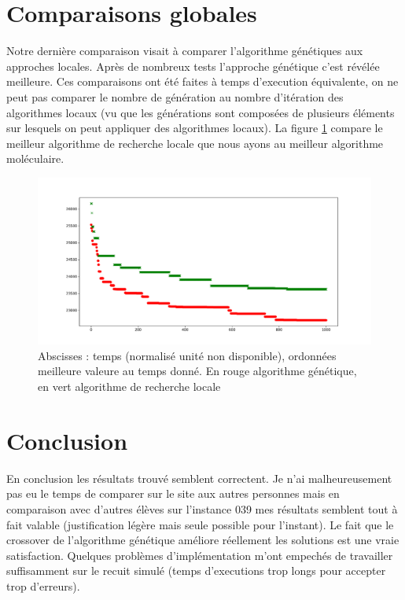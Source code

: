 \documentclass[10pt,a4paper]{article}
\begin{document}
\section{Comparaisons globales}

Notre dernière comparaison visait à comparer l'algorithme génétiques aux approches locales. Après de nombreux tests l'approche génétique c'est révélée meilleure. Ces comparaisons ont été faites à temps d'execution équivalente, on ne peut pas comparer le nombre de génération au nombre d'itération des algorithmes locaux (vu que les générations sont composées de plusieurs éléments sur lesquels on peut appliquer des algorithmes locaux). La figure \ref{comparegeneral} compare le meilleur algorithme de recherche locale que nous ayons au meilleur algorithme moléculaire. 


\begin{figure}
\centering
\includegraphics[scale=.4]{images/comparaison_genetic_without_error.pdf}
\caption{Abscisses : temps (normalisé unité non disponible), ordonnées meilleure valeure au temps donné. En rouge algorithme génétique, en vert algorithme de recherche locale}
\label{comparegeneral}
\end{figure}


\section{Conclusion}

En conclusion les résultats trouvé semblent correctent. Je n'ai malheureusement pas eu le temps de comparer sur le site aux autres personnes mais en comparaison avec d'autres élèves sur l'instance 039 mes résultats semblent tout à fait valable (justification légère mais seule possible pour l'instant). Le fait que le crossover de l'algorithme génétique améliore réellement les solutions est une vraie satisfaction.
 Quelques problèmes d'implémentation m'ont empechés de travailler suffisamment sur le recuit simulé (temps d'executions trop longs pour accepter trop d'erreurs).
 
 
\end{document}
